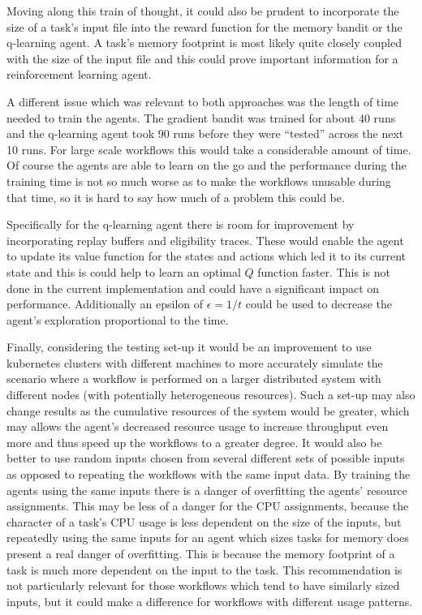 Moving along this train of thought, it could also be prudent to incorporate the size of a task’s input file into the reward function for the memory bandit or the q-learning agent. A task’s memory footprint is most likely quite closely coupled with the size of the input file and this could prove important information for a reinforcement learning agent.

A different issue which was relevant to both approaches was the length of time needed to train the agents. The gradient bandit was trained for about 40 runs and the q-learning agent took 90 runs before they were “tested” across the next 10 runs. For large scale workflows this would take a considerable amount of time. Of course the agents are able to learn on the go and the performance during the training time is not so much worse as to make the workflows unusable during that time, so it is hard to say how much of a problem this could be.

Specifically for the q-learning agent there is room for improvement by incorporating replay buffers and eligibility traces. These would enable the agent to update its value function for the states and actions which led it to its current state and this is could help to learn an optimal $Q$ function faster. This is not done in the current implementation and could have a significant impact on performance. Additionally an epsilon of $\epsilon = 1/t$ could be used to decrease the agent’s exploration proportional to the time.

Finally, considering the testing set-up it would be an improvement to use kubernetes clusters with different machines to more accurately simulate the scenario where a workflow is performed on a larger distributed system with different nodes (with potentially heterogeneous resources). Such a set-up may also change results as the cumulative resources of the system would be greater, which may allows the agent’s decreased resource usage to increase throughput even more and thus speed up the workflows to a greater degree. It would also be better to use random inputs chosen from several different sets of possible inputs as opposed to repeating the workflows with the same input data. By training the agents using the same inputs there is a danger of overfitting the agents’ resource assignments. This may be less of a danger for the CPU assignments, because the character of a task’s CPU usage is less dependent on the size of the inputs, but repeatedly using the same inputs for an agent which sizes tasks for memory does present a real danger of overfitting. This is because the memory footprint of a task is much more dependent on the input to the task. This recommendation is not particularly relevant for those workflows which tend to have similarly sized inputs, but it could make a difference for workflows with different usage patterns.

